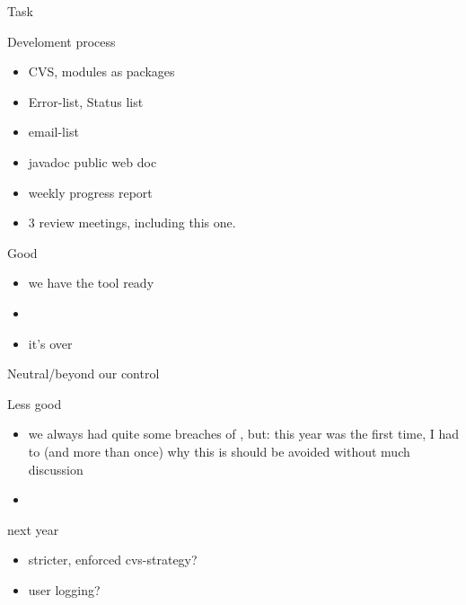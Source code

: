 


\begin{myslide}{Task}
  
\end{myslide}


\begin{myslide}{Develoment process}
  \begin{itemize}
  \item CVS, modules as packages
  \item Error-list, Status list
  \item email-list
  \item javadoc public web doc
  \item weekly progress report
  \item 3 review meetings, including this one. 
  \end{itemize}
\end{myslide}


\begin{myslide}{Good}
  \begin{itemize}
  \item we have the tool ready
  \item 
  \item it's over
  \end{itemize}
  
\end{myslide}
\begin{myslide}{Neutral/beyond our control}
  
\end{myslide}

\begin{myslide}{Less good}
  \begin{itemize}
  \item we always had quite some breaches of , but:
    this year was the first time, I had to  (and more
    than once) why this is should be avoided without much discussion
  \item 
  \end{itemize}
  
\end{myslide}
\begin{myslide}{next year}
  \begin{itemize}
  \item stricter, enforced cvs-strategy?
  \item user logging?
  \end{itemize}
\end{myslide}



